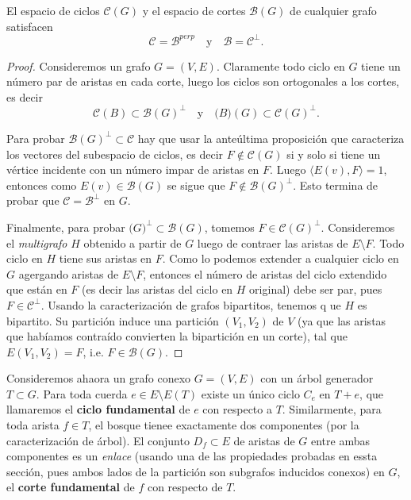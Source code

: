 \documentclass[../main.tex]{subfiles}
\begin{document}
\begin{theorem}
El espacio de ciclos $\mathcal{C}(G)$ y el espacio de cortes $\mathcal{B}(G)$ de cualquier grafo satisfacen
\[
    \mathcal C = \mathcal B^{perp} \quad \text{y} \quad \mathcal B = \mathcal C^{\perp}.
\]
\end{theorem}
\begin{proof}
Consideremos un grafo $G = (V,E)$. Claramente todo ciclo en $G$ tiene un número par de aristas en cada corte, luego los ciclos son ortogonales a los cortes, es decir
$$
\mathcal{C}(B) \subset \mathcal{B}(G)^\perp \quad \text{y} \quad \mathcal(B)(G)  \subset \mathcal{C}(G)^\perp.
$$

Para probar $\mathcal{B}(G)^\perp \subset \mathcal C$ hay que usar la anteúltima proposición que caracteriza los vectores del subespacio de ciclos, es decir $F \not \in \mathcal{C}(G)$ si y solo si tiene un vértice incidente con un número impar de aristas en $F$. Luego $\langle E(v), F \rangle = 1$, entonces como $E(v) \in \mathcal{B}(G)$ se sigue que $F \not \in \mathcal{B}(G)^\perp$. Esto termina de probar que $\mathcal C = \mathcal B ^\perp$ en $G$.

Finalmente, para probar $\mathcal (G)^\perp \subset \mathcal B (G)$, tomemos $F \in \mathcal C (G)^\perp$. Consideremos el \textit{multigrafo} $H$ obtenido a partir de $G$ luego de contraer las aristas de $E \setminus F$. Todo ciclo en $H$ tiene sus aristas en $F$. Como lo podemos extender a cualquier ciclo en $G$ agergando aristas de $E\setminus F$, entonces el número de aristas del ciclo extendido que están en $F$ (es decir las aristas del ciclo en $H$ original) debe ser par, pues $F \in \mathcal C ^\perp$. Usando la caracterización de grafos bipartitos, tenemos q ue $H$ es bipartito. Su partición induce una partición $(V_1,V_2)$ de $V$ (ya que las aristas que habíamos contraído convierten la bipartición en un corte), tal que $E(V_1,V_2) = F$, i.e. $F \in \mathcal{B}(G)$.
\end{proof}



Consideremos ahaora un grafo conexo $G = (V,E)$ con un árbol generador $T \subset G$. Para toda cuerda $e \in E \setminus E(T)$ existe un único ciclo $C_e$ en $T+e$, que llamaremos el \textbf{ciclo fundamental} de $e$ con respecto a $T$. Similarmente, para toda arista $f \in T$, el bosque tienee exactamente dos componentes (por la caracterización de árbol). El conjunto $D_f \subset E$ de aristas de $G$ entre ambas componentes es un \textit{enlace} (usando una de las propiedades probadas en essta sección, pues ambos lados de la partición son subgrafos inducidos conexos) en $G$, el \textbf{corte fundamental} de $f$ con respecto de $T$.
\end{document}
